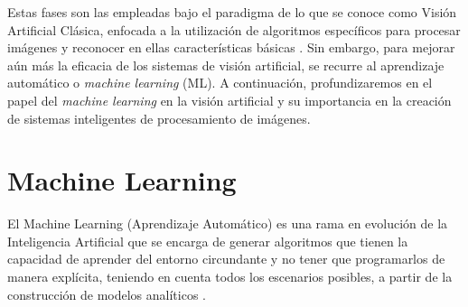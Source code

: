 Estas fases son las empleadas bajo el paradigma de lo que se conoce como Visión
Artificial Clásica, enfocada a la utilización de algoritmos específicos para procesar imágenes y reconocer en ellas características básicas \cite{Martinez22}.%
Sin embargo, para mejorar aún más la eficacia de los sistemas de visión artificial, se recurre al aprendizaje automático o \textit{machine learning} (ML). A continuación, profundizaremos en el papel del \textit{machine learning} en la visión artificial y su importancia en la creación de sistemas inteligentes de procesamiento de imágenes. 

\section{Machine Learning}
\label{sec:MachineLearning} 

El Machine Learning (Aprendizaje Automático) es una rama en evolución de la Inteligencia Artificial que se encarga de generar algoritmos que tienen la capacidad de aprender del entorno circundante y no tener que programarlos de manera explícita, teniendo en cuenta todos los escenarios posibles, a partir de la construcción de modelos analíticos \cite{Sandoval18}. %



 
